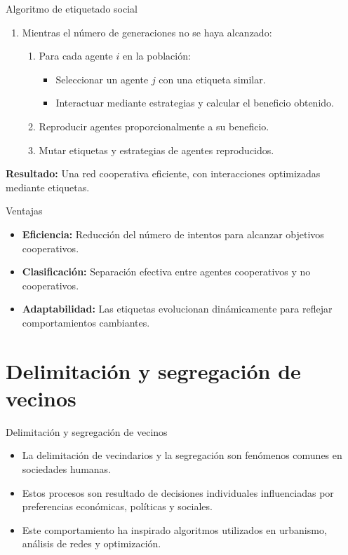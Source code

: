 \documentclass{beamer}
\begin{document}
\begin{frame}{Algoritmo de etiquetado social}
    \begin{enumerate}
        \item Mientras el número de generaciones no se haya alcanzado:
        \begin{enumerate}
            \item Para cada agente \( i \) en la población:
            \begin{itemize}
                \item Seleccionar un agente \( j \) con una etiqueta similar.
                \item Interactuar mediante estrategias y calcular el beneficio obtenido.
            \end{itemize}
            \item Reproducir agentes proporcionalmente a su beneficio.
            \item Mutar etiquetas y estrategias de agentes reproducidos.
        \end{enumerate}
    \end{enumerate}
    \textbf{Resultado:} Una red cooperativa eficiente, con interacciones optimizadas mediante etiquetas.
\end{frame}

\begin{frame}{Ventajas}
    \begin{itemize}
        \item \textbf{Eficiencia:} Reducción del número de intentos para alcanzar objetivos cooperativos.
        \item \textbf{Clasificación:} Separación efectiva entre agentes cooperativos y no cooperativos.
        \item \textbf{Adaptabilidad:} Las etiquetas evolucionan dinámicamente para reflejar comportamientos cambiantes.
    \end{itemize}
\end{frame}

\section{Delimitación y segregación de vecinos}

\begin{frame}{Delimitación y segregación de vecinos}
\begin{itemize}
        \item La delimitación de vecindarios y la segregación son fenómenos comunes en sociedades humanas.
        \item Estos procesos son resultado de decisiones individuales influenciadas por preferencias económicas, políticas y sociales.
        \item Este comportamiento ha inspirado algoritmos utilizados en urbanismo, análisis de redes y optimización.
    \end{itemize}
\end{frame}
\end{document}
